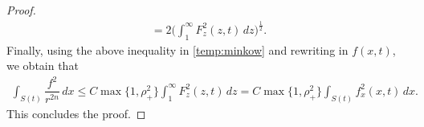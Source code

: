 \documentclass[a4paper,12pt,draft]{article}
\theoremstyle{remark}
\begin{document}
\begin{proof}
\begin{align*}
         = 2 \bigg(\int_{1}^{\infty}\!\! F_z^2(z,t)\, dz \bigg)^{\frac{1}{2}}.
    \end{align*}
    Finally, using the above inequality in \eqref{temp:minkow} and rewriting in $f(x,t)$, we obtain that
    \begin{align*}
        \int_{S(t)} \dfrac{f^2}{r^{2n}} \, dx 
        \le C \max\{1,\rho_{+}^2\} \int_{1}^{\infty} \!\!F_{z}^2 (z,t)\, dz = C  \max\{1,\rho_{+}^2\} \int_{S(t)}\! f_x^2(x,t)\, dx.
    \end{align*}
    This concludes the proof.
\end{proof}
\end{document}
